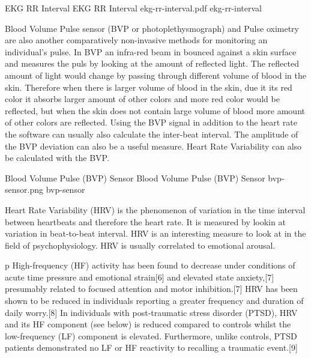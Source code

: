 \img
{EKG RR Interval}
{EKG RR Interval}
{ekg-rr-interval.pdf}
{ekg-rr-interval}

Blood Volume Pulse sensor (BVP or photoplethysmograph) and Pulse oximetry are also another comparatively non-invasive methods for monitoring an individual's pulse. In BVP an infra-red beam in bounced against a skin surface and measures the puls by looking at the amount of reflected light. The reflected amount of light would change by passing through different volume of blood in the skin. Therefore when there is larger volume of blood in the skin, due it its red color it absorbs larger amount of other colors and more red color would be reflected, but when the skin does not contain large volume of blood more amount of other colors are reflected. Using the BVP signal in addition to the heart rate the software can usually also calculate the inter-beat interval. The amplitude of the BVP deviation can also be a useful measure. Heart Rate Variability can also be calculated with the BVP.

\img
{Blood Volume Pulse (BVP) Sensor}
{Blood Volume Pulse (BVP) Sensor}
{bvp-sensor.png}
{bvp-sensor}

Heart Rate Variability (HRV) is the phenomenon of variation in the time interval between heartbeats and therefore the heart rate. It is measured by lookin at variation in beat-to-beat interval. HRV is an interesting measure to look at in the field of psychophysiology. HRV is usually correlated to emotional arousal. %

p High-frequency (HF) activity has been found to decrease under conditions of acute time pressure and emotional strain[6] and elevated state anxiety,[7] presumably related to focused attention and motor inhibition.[7] HRV has been shown to be reduced in individuals reporting a greater frequency and duration of daily worry.[8] In individuals with post-traumatic stress disorder (PTSD), HRV and its HF component (see below) is reduced compared to controls whilst the low-frequency (LF) component is elevated. Furthermore, unlike controls, PTSD patients demonstrated no LF or HF reactivity to recalling a traumatic event.[9]

